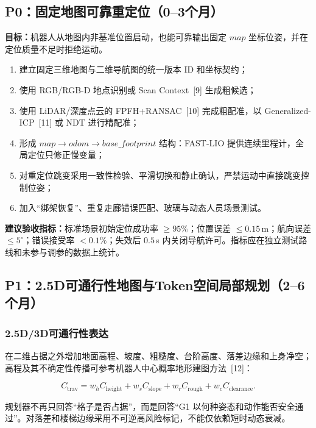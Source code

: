 \documentclass[11pt,a4paper,fontset=none]{ctexart}
\begin{document}
\subsection{P0：固定地图可靠重定位（0--3个月）}

\textbf{目标：}机器人从地图内非基准位置启动，也能可靠输出固定 $map$ 坐标位姿，并在定位质量不足时拒绝运动。

\begin{enumerate}
  \item 建立固定三维地图与二维导航图的统一版本 ID 和坐标契约；
  \item 使用 RGB/RGB-D 地点识别或 Scan Context~[9] 生成粗候选；
  \item 使用 LiDAR/深度点云的 FPFH+RANSAC~[10] 完成粗配准，以 Generalized-ICP~[11] 或 NDT 进行精配准；
  \item 形成 $map\rightarrow odom\rightarrow base\_footprint$ 结构：FAST-LIO 提供连续里程计，全局定位只修正慢变量；
  \item 对重定位跳变采用一致性检验、平滑切换和静止确认，严禁运动中直接跳变控制位姿；
  \item 加入“绑架恢复”、重复走廊错误匹配、玻璃与动态人员场景测试。
\end{enumerate}

\textbf{建议验收指标：}标准场景初始定位成功率 $\geq95\%$；位置误差 $\leq0.15\,$m；航向误差 $\leq5^\circ$；错误接受率 $<0.1\%$；失效后 $0.5\,$s 内关闭导航许可。指标应在独立测试路线和未参与调参的数据上统计。

\subsection{P1：2.5D可通行性地图与Token空间局部规划（2--6个月）}

\subsubsection{2.5D/3D可通行性表达}

在二维占据之外增加地面高程、坡度、粗糙度、台阶高度、落差边缘和上身净空；高程及其不确定性传播可参考机器人中心概率地形建图方法~[12]：

\begin{equation}
C_{\mathrm{trav}}=w_h C_{\mathrm{height}}+w_s C_{\mathrm{slope}}
+w_r C_{\mathrm{rough}}+w_c C_{\mathrm{clearance}}.
\end{equation}

规划器不再只回答“格子是否占据”，而是回答“G1 以何种姿态和动作能否安全通过”。对落差和楼梯边缘采用不可逆高风险标记，不能仅依赖短时动态衰减。
\end{document}
